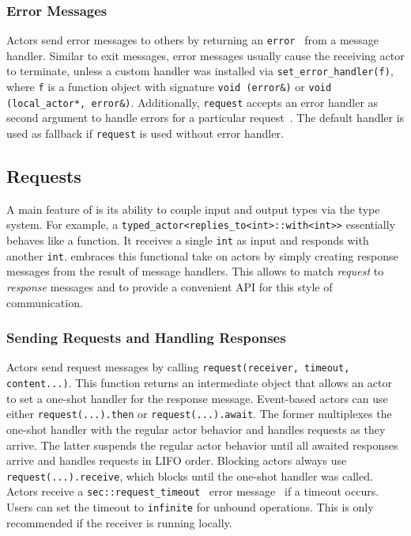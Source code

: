 \subsubsection{Error Messages}
\label{error-message}

Actors send error messages to others by returning an \lstinline^error^~ from a message handler. Similar to exit messages, error messages usually cause the receiving actor to terminate, unless a custom handler was installed via \lstinline^set_error_handler(f)^, where \lstinline^f^ is a function object with signature \lstinline^void (error&)^ or \lstinline^void (local_actor*, error&)^. Additionally, \lstinline^request^ accepts an error handler as second argument to handle errors for a particular request~. The default handler is used as fallback if \lstinline^request^ is used without error handler. 

\subsection{Requests}
\label{request}

A main feature of \lib is its ability to couple input and output types via the type system. For example, a \lstinline^typed_actor<replies_to<int>::with<int>>^ essentially behaves like a function. It receives a single \lstinline^int^ as input and responds with another \lstinline^int^. \lib embraces this functional take on actors by simply creating response messages from the result of message handlers. This allows \lib to match \emph{request} to \emph{response} messages and to provide a convenient API for this style of communication.

\subsubsection{Sending Requests and Handling Responses}
\label{handling-response}

Actors send request messages by calling \lstinline^request(receiver, timeout, content...)^. This function returns an intermediate object that allows an actor to set a one-shot handler for the response message. Event-based actors can use either \lstinline^request(...).then^ or \lstinline^request(...).await^. The former multiplexes the one-shot handler with the regular actor behavior and handles requests as they arrive. The latter suspends the regular actor behavior until all awaited responses arrive and handles requests in LIFO order. Blocking actors always use \lstinline^request(...).receive^, which blocks until the one-shot handler was called. Actors receive a \lstinline^sec::request_timeout^~ error message~ if a timeout occurs. Users can set the timeout to \lstinline^infinite^ for unbound operations. This is only recommended if the receiver is running locally.

